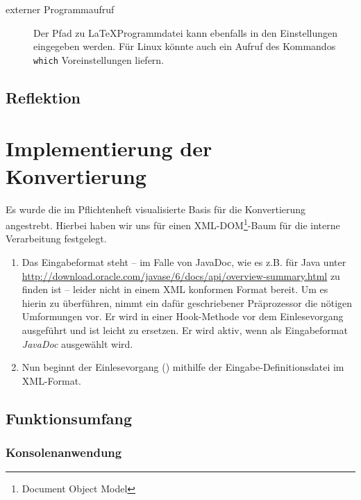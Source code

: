 \documentclass[	a4paper,		%
		titlepage, 		%
		fontsize=12pt		%
		]{scrartcl} 		%
\begin{document}
\begin{description}
\item[externer Programmaufruf]
Der Pfad zu \LaTeX Programmdatei kann ebenfalls in den Einstellungen eingegeben werden.
Für Linux könnte auch ein Aufruf des Kommandos \texttt{which} Voreinstellungen liefern.

 \end{description}

\subsection{Reflektion}


\section{Implementierung der Konvertierung}
Es wurde die im Pflichtenheft visualisierte Basis für die Konvertierung angestrebt. Hierbei haben wir uns für einen XML-DOM\footnote{Document Object Model}-Baum für die interne Verarbeitung festgelegt.
\begin{enumerate}
 \item Das Eingabeformat steht -- im Falle von JavaDoc, wie es z.B. für Java unter \href{http://download.oracle.com/javase/6/docs/api/overview-summary.html}{http://download.oracle.com/javase/6/docs/api/overview-summary.html} zu finden ist -- leider nicht in einem XML konformen Format bereit. Um es hierin zu überführen, nimmt ein dafür geschriebener Präprozessor die nötigen Umformungen vor. Er wird in einer Hook-Methode vor dem Einlesevorgang ausgeführt und ist leicht zu ersetzen. Er wird aktiv, wenn als Eingabeformat \emph{JavaDoc} ausgewählt wird.
 \item Nun beginnt der Einlesevorgang (\texttt{}) mithilfe der Eingabe-Definitionsdatei im XML-Format.


\end{enumerate}




\begin{figure} [H]
\centering
\resizebox*{.70\textheight}{!}{}
\end{figure}

\subsection{Funktionsumfang}

\subsubsection{Konsolenanwendung}
\end{document}

